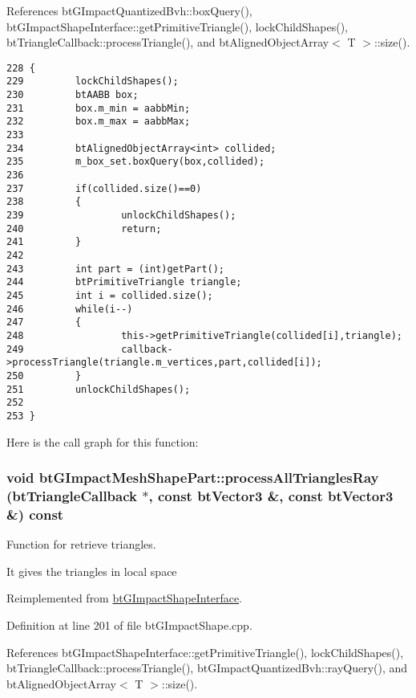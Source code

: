 References btGImpactQuantizedBvh::boxQuery(), btGImpactShapeInterface::getPrimitiveTriangle(), lockChildShapes(), btTriangleCallback::processTriangle(), and btAlignedObjectArray$<$ T $>$::size().

\begin{Code}\begin{verbatim}228 {
229         lockChildShapes();
230         btAABB box;
231         box.m_min = aabbMin;
232         box.m_max = aabbMax;
233 
234         btAlignedObjectArray<int> collided;
235         m_box_set.boxQuery(box,collided);
236 
237         if(collided.size()==0)
238         {
239                 unlockChildShapes();
240                 return;
241         }
242 
243         int part = (int)getPart();
244         btPrimitiveTriangle triangle;
245         int i = collided.size();
246         while(i--)
247         {
248                 this->getPrimitiveTriangle(collided[i],triangle);
249                 callback->processTriangle(triangle.m_vertices,part,collided[i]);
250         }
251         unlockChildShapes();
252 
253 }
\end{verbatim}
\end{Code}




Here is the call graph for this function:\hypertarget{classbt_g_impact_mesh_shape_part_0e35b55bd50911911f8164cf3a2dd5c8}{
\subsubsection[processAllTrianglesRay]{\setlength{\rightskip}{0pt plus 5cm}void btGImpactMeshShapePart::processAllTrianglesRay ({\bf btTriangleCallback} $\ast$, \/  const btVector3 \&, \/  const btVector3 \&) const}}
\label{classbt_g_impact_mesh_shape_part_0e35b55bd50911911f8164cf3a2dd5c8}


Function for retrieve triangles. 

It gives the triangles in local space 

Reimplemented from \hyperlink{classbt_g_impact_shape_interface_646ad13b4aa116d58df110c2f407e5a8}{btGImpactShapeInterface}.

Definition at line 201 of file btGImpactShape.cpp.

References btGImpactShapeInterface::getPrimitiveTriangle(), lockChildShapes(), btTriangleCallback::processTriangle(), btGImpactQuantizedBvh::rayQuery(), and btAlignedObjectArray$<$ T $>$::size().

